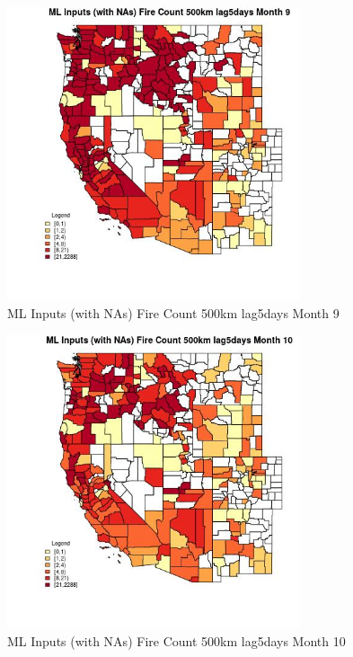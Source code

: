 \begin{figure} 
\centering  
\includegraphics[width=0.77\textwidth]{Code_Outputs/Report_ML_input_PM25_Step4_part_e_de_duplicated_aves_compiled_2019-05-21wNAs_CountyFire_Count_500km_lag5daysmedianMonth9.jpg} 
\caption{\label{fig:Report_ML_input_PM25_Step4_part_e_de_duplicated_aves_compiled_2019-05-21wNAsCountyFire_Count_500km_lag5daysmedianMonth9}ML Inputs (with NAs) Fire Count 500km lag5days Month 9} 
\end{figure} 
 

\begin{figure} 
\centering  
\includegraphics[width=0.77\textwidth]{Code_Outputs/Report_ML_input_PM25_Step4_part_e_de_duplicated_aves_compiled_2019-05-21wNAs_CountyFire_Count_500km_lag5daysmedianMonth10.jpg} 
\caption{\label{fig:Report_ML_input_PM25_Step4_part_e_de_duplicated_aves_compiled_2019-05-21wNAsCountyFire_Count_500km_lag5daysmedianMonth10}ML Inputs (with NAs) Fire Count 500km lag5days Month 10} 
\end{figure} 
 


